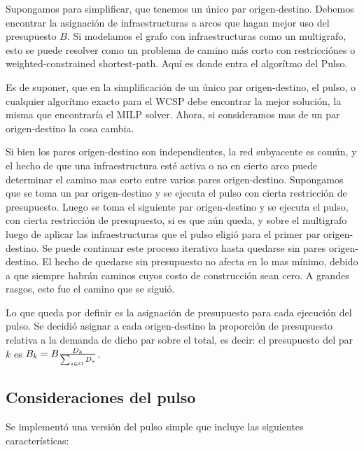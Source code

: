 \documentclass{article}
\begin{document}
  Supongamos para simplificar, que tenemos un único par origen-destino. Debemos encontrar la asignación de infraestructuras a arcos que hagan mejor uso del presupuesto $B$. Si modelamos el grafo con infraestructuras como un multigrafo, esto se puede resolver como un problema de camino más corto con restricciónes o weighted-constrained shortest-path. Aquí es donde entra el algorítmo del Pulso.

  Es de suponer, que en la simplificación de un único par origen-destino, el pulso, o cualquier algorítmo exacto para el WCSP debe encontrar la mejor solución, la misma que encontraría el MILP solver. Ahora, si consideramos mas de un par origen-destino la cosa cambia.

  Si bien los pares origen-destino son independientes, la red subyacente es común, y el hecho de que una infraestructura esté activa o no en cierto arco puede determinar el camino mas corto entre varios pares origen-destino. Supongamos que se toma un par origen-destino y se ejecuta el pulso con cierta restricción de presupuesto. Luego se toma el siguiente par origen-destino y se ejecuta el pulso, con cierta restricción de presupuesto, si es que aún queda, y sobre el multigrafo luego de aplicar las infraestructuras que el pulso eligió para el primer par origen-destino. Se puede continuar este proceso iterativo hasta quedarse sin pares origen-destino. El hecho de quedarse sin presupuesto no afecta en lo mas mínimo, debido a que siempre habrán caminos cuyos costo de construcción sean cero. A grandes rasgos, este fue el camino que se siguió.

  Lo que queda por definir es la asignación de presupuesto para cada ejecución del pulso. Se decidió asignar a cada origen-destino la proporción de presupuesto relativa a la demanda de dicho par sobre el total, es decir: el presupuesto del par $k$ es $B_k = B  {D_k \over \sum_{s \in O} D_s}$.

  \subsection*{Consideraciones del pulso}

  Se implementó una versión del pulso simple que incluye las siguientes características:
\end{document}
